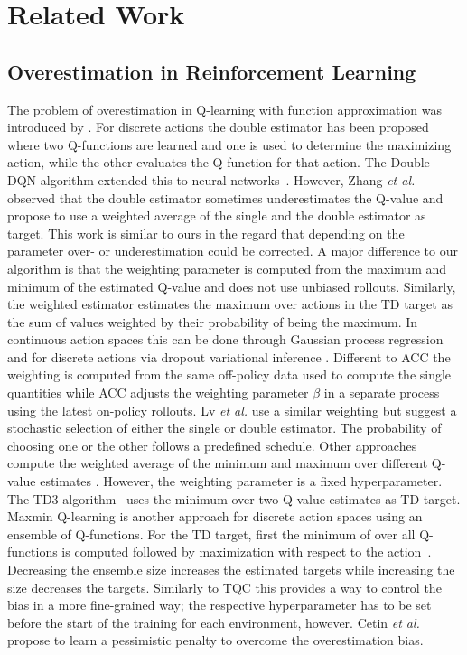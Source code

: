 \section{Related Work}


\subsection{Overestimation in Reinforcement Learning}


The problem of overestimation in Q-learning with function approximation was introduced by \cite{Thrun+Schwartz:1993}.
For discrete actions the double estimator has been proposed \cite{hasselt2010double} where two Q-functions are learned and one is used to determine the maximizing action, while the other evaluates the Q-function for that action. The Double DQN algorithm extended this to neural networks~\cite{hasselt2016deepdouble}.
However, Zhang \emph{et al.} \cite{weightedQlearning} observed that the double estimator sometimes underestimates the Q-value and propose to use a weighted average of the single and the double estimator as target. This work is similar to ours in the regard that depending on the parameter over- or underestimation could be corrected. A major difference to our algorithm is that the weighting parameter is computed from the maximum and minimum of the estimated Q-value and does not use unbiased rollouts.
Similarly, the weighted estimator
\cite{cini2020deep,d2017estimating} 
estimates the maximum over actions in the TD target as the sum of values weighted by their probability of being the maximum. In continuous action spaces this can be done through Gaussian process regression
\cite{d2017estimating} and for discrete actions via dropout variational inference \cite{cini2020deep}.
Different to ACC the weighting is computed from the same off-policy data used to compute the single quantities while ACC adjusts the weighting parameter $\beta$ in a separate process using the latest on-policy rollouts.
Lv \emph{et al.} \cite{lvSDDQ19} use a similar weighting but suggest a stochastic selection of either the single or double estimator. The probability of choosing one or the other follows a predefined schedule.
Other approaches compute the weighted average of the minimum and maximum over different Q-value estimates \cite{fujimoto2019off,kumarStabilizing19}. However, the weighting parameter is a fixed hyperparameter.
The TD3 algorithm~\cite{td3} uses the minimum over two Q-value estimates as TD target. 
Maxmin Q-learning is another approach for discrete action spaces using an ensemble of Q-functions. For the TD target, first  the minimum of over all Q-functions is computed followed by maximization with respect to the action~\cite{Lan2020Maxmin}. Decreasing the ensemble size increases the estimated targets while increasing the size decreases the targets. Similarly to TQC this provides a way to control the bias in a more fine-grained way; the respective hyperparameter has to be set before the start of the training for each environment, however.
Cetin \emph{et al.}  \cite{cetin2021learning} propose to learn a pessimistic penalty to overcome the overestimation bias.

